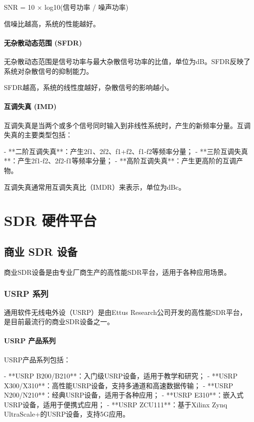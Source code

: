﻿\documentclass[UTF8]{ctexbook}
\begin{document}
SNR = 10 × log10(信号功率 / 噪声功率)

信噪比越高，系统的性能越好。

\subsubsection{无杂散动态范围 (SFDR)}

无杂散动态范围是信号功率与最大杂散信号功率的比值，单位为dB。SFDR反映了系统对杂散信号的抑制能力。

SFDR越高，系统的线性度越好，杂散信号的影响越小。

\subsubsection{互调失真 (IMD)}

互调失真是当两个或多个信号同时输入到非线性系统时，产生的新频率分量。互调失真的主要类型包括：

- **二阶互调失真**：产生2f1、2f2、f1+f2、f1-f2等频率分量；
- **三阶互调失真**：产生2f1-f2、2f2-f1等频率分量；
- **高阶互调失真**：产生更高阶的互调产物。

互调失真通常用互调失真比（IMDR）来表示，单位为dBc。

\chapter{SDR 硬件平台}

\section{商业 SDR 设备}

商业SDR设备是由专业厂商生产的高性能SDR平台，适用于各种应用场景。

\subsection{USRP 系列}

通用软件无线电外设（USRP）是由Ettus Research公司开发的高性能SDR平台，是目前最流行的商业SDR设备之一。

\subsubsection{USRP 产品系列}

USRP产品系列包括：

- **USRP B200/B210**：入门级USRP设备，适用于教学和研究；
- **USRP X300/X310**：高性能USRP设备，支持多通道和高速数据传输；
- **USRP N200/N210**：经典USRP设备，适用于各种应用；
- **USRP E310**：嵌入式USRP设备，适用于便携式应用；
- **USRP ZCU111**：基于Xilinx Zynq UltraScale+的USRP设备，支持5G应用。
\end{document}
